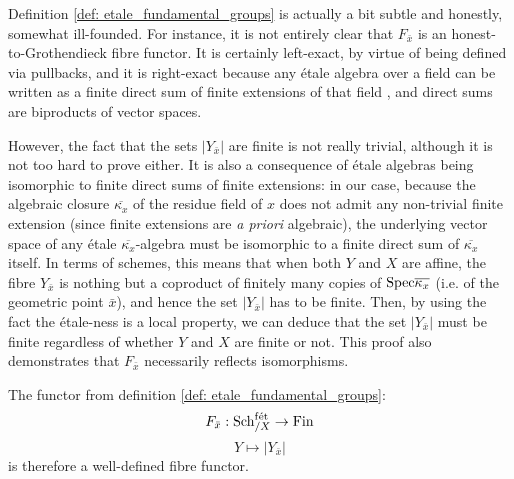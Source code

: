         \begin{remark}
            Definition \ref{def: etale_fundamental_groups} is actually a bit subtle and honestly, somewhat ill-founded. For instance, it is not entirely clear that $F_{\bar{x}}$ is an honest-to-Grothendieck fibre functor. It is certainly left-exact, by virtue of being defined via pullbacks, and it is right-exact because any \'etale algebra over a field can be written as a finite direct sum of finite extensions of that field \cite[\href{https://stacks.math.columbia.edu/tag/00U3}{Tag 00U3}]{stacks}, and direct sums are biproducts of vector spaces. 
            
            However, the fact that the sets $|Y_{\bar{x}}|$ are finite is not really trivial, although it is not too hard to prove either. It is also a consequence of \'etale algebras being isomorphic to finite direct sums of finite extensions: in our case, because the algebraic closure $\overline{\kappa_x}$ of the residue field of $x$ does not admit any non-trivial finite extension (since finite extensions are \textit{a priori} algebraic), the underlying vector space of any \'etale $\overline{\kappa_x}$-algebra must be isomorphic to a finite direct sum of $\overline{\kappa_x}$ itself. In terms of schemes, this means that when both $Y$ and $X$ are affine, the fibre $Y_{\bar{x}}$ is nothing but a coproduct of finitely many copies of $\mathrm{Spec} \overline{\kappa_x}$ (i.e. of the geometric point $\bar{x}$), and hence the set $|Y_{\bar{x}}|$ has to be finite. Then, by using the fact the \'etale-ness is a local property, we can deduce that the set $|Y_{\bar{x}}|$ must be finite regardless of whether $Y$ and $X$ are finite or not. This proof also demonstrates that $F_{\bar{x}}$ necessarily reflects isomorphisms.
            
            The functor from definition \ref{def: etale_fundamental_groups}:
                $$F_{\bar{x}}: \mathrm{Sch}_{/X}^{\mathrm{f\acute{e}t}} \to \mathrm{Fin}$$
                $$Y \mapsto |Y_{\bar{x}}|$$
            is therefore a well-defined fibre functor.
        \end{remark}
        
